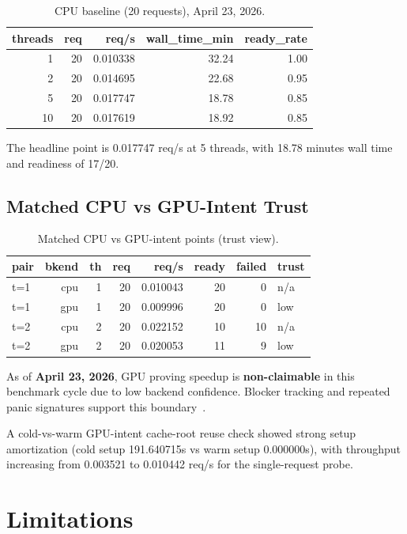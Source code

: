 \documentclass[manuscript,nonacm]{acmart}
\begin{document}
\begin{table}[t]
\caption{CPU baseline (20 requests), April 23, 2026.}
\label{tab:cpu}
\centering
\small
\begin{tabular}{rrrrr}
\toprule
threads & req & req/s & wall\_time\_min & ready\_rate \\
\midrule
1  & 20 & 0.010338 & 32.24 & 1.00 \\
2  & 20 & 0.014695 & 22.68 & 0.95 \\
5  & 20 & 0.017747 & 18.78 & 0.85 \\
10 & 20 & 0.017619 & 18.92 & 0.85 \\
\bottomrule
\end{tabular}
\end{table}

The headline point is 0.017747 req/s at 5 threads, with 18.78 minutes wall time and readiness of 17/20.

\subsection{Matched CPU vs GPU-Intent Trust}

\begin{table}[t]
\caption{Matched CPU vs GPU-intent points (trust view).}
\label{tab:gpu}
\centering
\small
\begin{tabular}{lrrrrrrl}
\toprule
pair & bkend & th & req & req/s & ready & failed & trust \\
\midrule
t=1 & cpu & 1 & 20 & 0.010043 & 20 & 0  & n/a \\
t=1 & gpu & 1 & 20 & 0.009996 & 20 & 0  & low \\
t=2 & cpu & 2 & 20 & 0.022152 & 10 & 10 & n/a \\
t=2 & gpu & 2 & 20 & 0.020053 & 11 & 9  & low \\
\bottomrule
\end{tabular}
\end{table}

As of \textbf{April 23, 2026}, GPU proving speedup is \textbf{non-claimable} in this benchmark cycle due to low backend confidence. Blocker tracking and repeated panic signatures support this boundary~\cite{ezklIssue882}.

A cold-vs-warm GPU-intent cache-root reuse check showed strong setup amortization (cold setup 191.640715s vs warm setup 0.000000s), with throughput increasing from 0.003521 to 0.010442 req/s for the single-request probe.

\section{Limitations}
\end{document}
